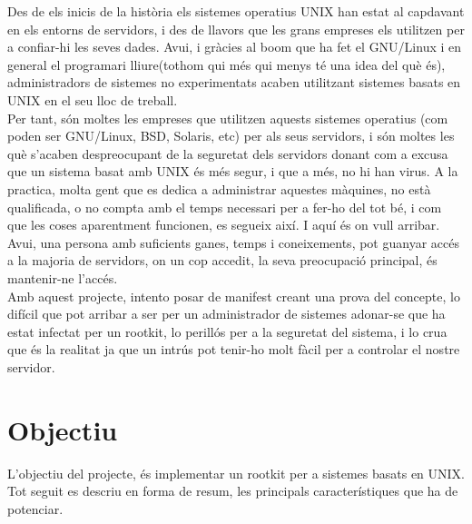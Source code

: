 Des de els inicis de la història els sistemes operatius UNIX han estat al capdavant en els
entorns de servidors, i des de llavors que les grans empreses els utilitzen per a confiar-hi
les seves dades. Avui, i gràcies al boom que ha fet el GNU/Linux i en general el programari lliure(tothom qui més qui
menys té una idea del què és), administradors de sistemes no experimentats acaben
utilitzant sistemes basats en UNIX en el seu lloc de treball. \\
Per tant, són moltes les empreses que utilitzen aquests sistemes operatius (com poden ser
GNU/Linux, BSD, Solaris, etc) per als seus servidors, i són moltes les què s'acaben despreocupant
de la seguretat dels servidors donant com a excusa que un sistema basat amb UNIX és
més segur, i que a més, no hi han virus. A la practica, molta gent que es dedica a
administrar aquestes màquines, no està qualificada, o no compta amb el temps necessari
per a fer-ho del tot bé, i com que les coses aparentment funcionen, es segueix així.
I aquí és on vull arribar. Avui, una persona amb suficients ganes, temps i
coneixements, pot guanyar accés a la majoria de servidors, on un cop accedit, la seva
preocupació principal, és mantenir-ne l'accés.\\


Amb aquest projecte, intento posar de manifest creant una prova del concepte, lo difícil
que pot arribar a ser per un administrador de sistemes adonar-se que ha estat infectat per
un rootkit, lo perillós per a la seguretat del sistema, i lo crua que és la realitat ja que un
intrús pot tenir-ho molt fàcil per a controlar el nostre servidor.

\section{Objectiu}

L'objectiu del projecte, és implementar un rootkit per a sistemes basats en UNIX. Tot seguit
es descriu en forma de resum, les principals característiques que ha de potenciar. 

